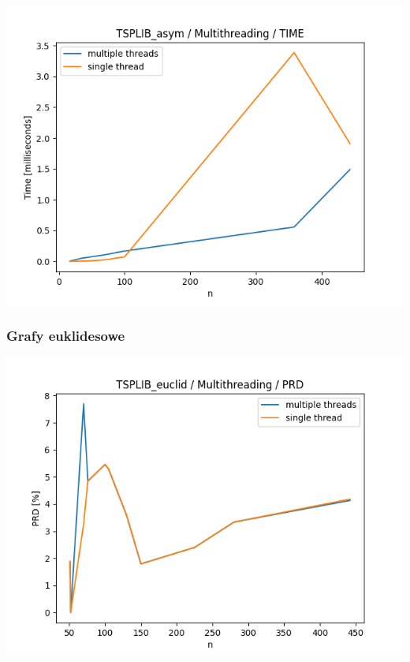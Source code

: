 \documentclass{article}
\begin{document}
\begin{center}
\includegraphics[width=\textwidth, 
                   height = 0.4\textheight, 
                   keepaspectratio]
                  {plots/multithreading_tsplib_asym_time} 
\end{center}

\subsubsection{Grafy euklidesowe}

\begin{center}
\includegraphics[width=\textwidth, 
                   height = 0.4\textheight, 
                   keepaspectratio]
                  {plots/multithreading_tsplib_euclid_prd} 
\end{center}
\end{document}
